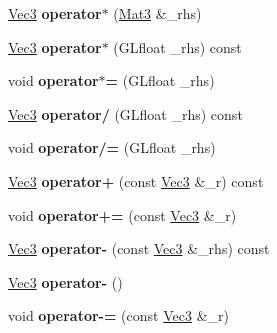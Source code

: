 \begin{DoxyCompactItemize}
\item 
\hypertarget{classVec3_a3ebcf5f1fb0f9a7ffd511d958d78fd91}{\hyperlink{classVec3}{Vec3} {\bfseries operator$\ast$} (\hyperlink{classMat3}{Mat3} \&\-\_\-rhs)}\label{classVec3_a3ebcf5f1fb0f9a7ffd511d958d78fd91}

\item 
\hypertarget{classVec3_a46ffb589de4804e6e6d37dea9c5a22b4}{\hyperlink{classVec3}{Vec3} {\bfseries operator$\ast$} (G\-Lfloat \-\_\-rhs) const }\label{classVec3_a46ffb589de4804e6e6d37dea9c5a22b4}

\item 
\hypertarget{classVec3_a678d1234531fdb6863a7171ea9cadd49}{void {\bfseries operator$\ast$=} (G\-Lfloat \-\_\-rhs)}\label{classVec3_a678d1234531fdb6863a7171ea9cadd49}

\item 
\hypertarget{classVec3_afadfe01be0d872aa61920c37f19eb9a4}{\hyperlink{classVec3}{Vec3} {\bfseries operator/} (G\-Lfloat \-\_\-rhs) const }\label{classVec3_afadfe01be0d872aa61920c37f19eb9a4}

\item 
\hypertarget{classVec3_a10db8b8877035b44b29df695f08b17ca}{void {\bfseries operator/=} (G\-Lfloat \-\_\-rhs)}\label{classVec3_a10db8b8877035b44b29df695f08b17ca}

\item 
\hypertarget{classVec3_af4bf43738408bc28c2298df99a420910}{\hyperlink{classVec3}{Vec3} {\bfseries operator+} (const \hyperlink{classVec3}{Vec3} \&\-\_\-r) const }\label{classVec3_af4bf43738408bc28c2298df99a420910}

\item 
\hypertarget{classVec3_a66d0477871d90a8ab7fe4fb903657ac3}{void {\bfseries operator+=} (const \hyperlink{classVec3}{Vec3} \&\-\_\-r)}\label{classVec3_a66d0477871d90a8ab7fe4fb903657ac3}

\item 
\hypertarget{classVec3_a1af6ff2a6a2c71bfe6f832ef61923edd}{\hyperlink{classVec3}{Vec3} {\bfseries operator-\/} (const \hyperlink{classVec3}{Vec3} \&\-\_\-rhs) const }\label{classVec3_a1af6ff2a6a2c71bfe6f832ef61923edd}

\item 
\hypertarget{classVec3_aab77f0f572c56fdee062228fe9b02242}{\hyperlink{classVec3}{Vec3} {\bfseries operator-\/} ()}\label{classVec3_aab77f0f572c56fdee062228fe9b02242}

\item 
\hypertarget{classVec3_ac6a5efb269a181d7b0e7a6a350f3cd20}{void {\bfseries operator-\/=} (const \hyperlink{classVec3}{Vec3} \&\-\_\-r)}\label{classVec3_ac6a5efb269a181d7b0e7a6a350f3cd20}


\end{DoxyCompactItemize}
